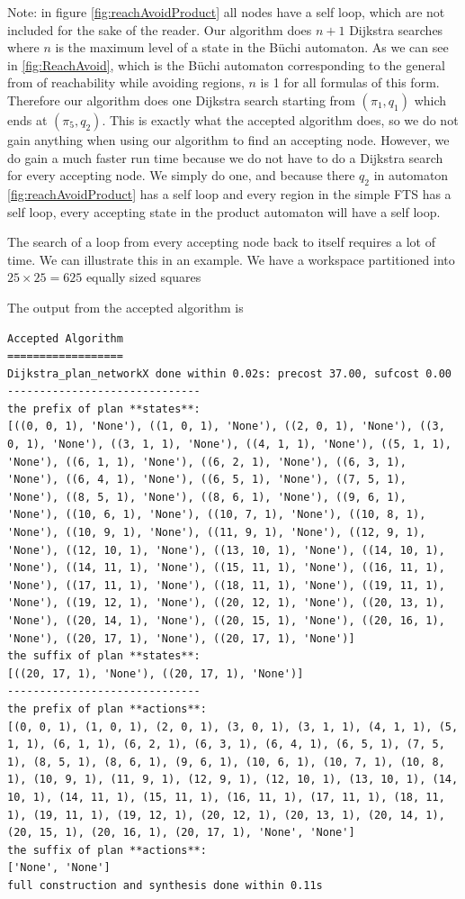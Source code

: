 Note: in figure \ref{fig:reachAvoidProduct} all nodes have a self loop, which are not included for the sake of the reader.
Our algorithm does $n+1$ Dijkstra searches where $n$ is the maximum level of a state in the B\"{u}chi automaton. As we can see in \ref{fig:ReachAvoid}, which is the B\"{u}chi automaton corresponding to the general from of reachability while avoiding regions, $n$ is 1 for all formulas of this form. Therefore our algorithm does one Dijkstra search starting from $(\pi_1,q_1)$ which ends at $(\pi_5,q_2)$. This is exactly what the accepted algorithm does, so we do not gain anything when using our algorithm to find an accepting node. However, we do gain a much faster run time because we do not have to do a Dijkstra search for every accepting node. We simply do one, and because there $q_2$ in automaton \ref{fig:reachAvoidProduct} has a self loop and every region in the simple FTS has a self loop, every accepting state in the product automaton will have a self loop.

The search of a loop from every accepting node back to itself requires a lot of time. We can illustrate this in an example. We have a workspace partitioned into $25 \times 25 = 625$ equally sized squares



The output from the accepted algorithm is
\begin{lstlisting}
Accepted Algorithm
==================
Dijkstra_plan_networkX done within 0.02s: precost 37.00, sufcost 0.00
------------------------------
the prefix of plan **states**:
[((0, 0, 1), 'None'), ((1, 0, 1), 'None'), ((2, 0, 1), 'None'), ((3, 0, 1), 'None'), ((3, 1, 1), 'None'), ((4, 1, 1), 'None'), ((5, 1, 1), 'None'), ((6, 1, 1), 'None'), ((6, 2, 1), 'None'), ((6, 3, 1), 'None'), ((6, 4, 1), 'None'), ((6, 5, 1), 'None'), ((7, 5, 1), 'None'), ((8, 5, 1), 'None'), ((8, 6, 1), 'None'), ((9, 6, 1), 'None'), ((10, 6, 1), 'None'), ((10, 7, 1), 'None'), ((10, 8, 1), 'None'), ((10, 9, 1), 'None'), ((11, 9, 1), 'None'), ((12, 9, 1), 'None'), ((12, 10, 1), 'None'), ((13, 10, 1), 'None'), ((14, 10, 1), 'None'), ((14, 11, 1), 'None'), ((15, 11, 1), 'None'), ((16, 11, 1), 'None'), ((17, 11, 1), 'None'), ((18, 11, 1), 'None'), ((19, 11, 1), 'None'), ((19, 12, 1), 'None'), ((20, 12, 1), 'None'), ((20, 13, 1), 'None'), ((20, 14, 1), 'None'), ((20, 15, 1), 'None'), ((20, 16, 1), 'None'), ((20, 17, 1), 'None'), ((20, 17, 1), 'None')]
the suffix of plan **states**:
[((20, 17, 1), 'None'), ((20, 17, 1), 'None')]
------------------------------
the prefix of plan **actions**:
[(0, 0, 1), (1, 0, 1), (2, 0, 1), (3, 0, 1), (3, 1, 1), (4, 1, 1), (5, 1, 1), (6, 1, 1), (6, 2, 1), (6, 3, 1), (6, 4, 1), (6, 5, 1), (7, 5, 1), (8, 5, 1), (8, 6, 1), (9, 6, 1), (10, 6, 1), (10, 7, 1), (10, 8, 1), (10, 9, 1), (11, 9, 1), (12, 9, 1), (12, 10, 1), (13, 10, 1), (14, 10, 1), (14, 11, 1), (15, 11, 1), (16, 11, 1), (17, 11, 1), (18, 11, 1), (19, 11, 1), (19, 12, 1), (20, 12, 1), (20, 13, 1), (20, 14, 1), (20, 15, 1), (20, 16, 1), (20, 17, 1), 'None', 'None']
the suffix of plan **actions**:
['None', 'None']
full construction and synthesis done within 0.11s
\end{lstlisting}

